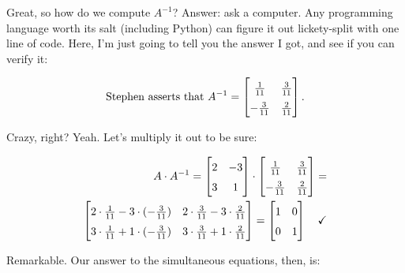 \smallskip

Great, so how do we compute $A^{-1}$? Answer: ask a computer. Any programming
language worth its salt (including Python) can figure it out lickety-split with
one line of code. Here, I'm just going to tell you the answer I got, and see if
you can verify it:

\vspace{-.15in}
\begin{align*}
\text{Stephen asserts that } A^{-1} =
\begingroup
\renewcommand*{\arraystretch}{1.5}
\begin{bmatrix}
\frac{1}{11} & \frac{3}{11} \\
-\frac{3}{11} & \frac{2}{11} \\
\end{bmatrix}.
\endgroup
\end{align*}
\vspace{-.15in}

Crazy, right? Yeah. Let's multiply it out to be sure:

\vspace{-.15in}
\begin{align*}
A \cdot A^{-1} =
\begin{bmatrix}
2 & -3 \\
3 & 1 \\
\end{bmatrix} \cdot
\begin{bmatrix}
\frac{1}{11} & \frac{3}{11} \\
-\frac{3}{11} & \frac{2}{11} \\
\end{bmatrix} = \\
\begingroup
\renewcommand*{\arraystretch}{1.5}
\begin{bmatrix}
2\cdot\frac{1}{11} - 3\cdot(-\frac{3}{11}) &
2\cdot\frac{3}{11} - 3\cdot\frac{2}{11} \\
3\cdot\frac{1}{11} + 1\cdot(-\frac{3}{11}) &
3\cdot\frac{3}{11} + 1\cdot\frac{2}{11} \\
\end{bmatrix} =
\endgroup
\begin{bmatrix}
1 & 0 \\
0 & 1 \\
\end{bmatrix} \quad \checkmark
\end{align*}
\vspace{-.15in}

Remarkable. Our answer to the simultaneous equations, then, is:

